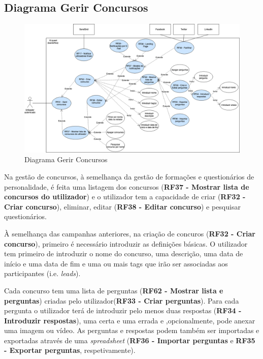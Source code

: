 \subsection{Diagrama Gerir Concursos}
\label{d:concursos}
\begin{figure}[ht!]
	\begin{center}
		\includegraphics[width=1\textwidth]{img/rf/gerir-concurso}
		\caption{Diagrama Gerir Concursos}
		\label{fig:rf-gerir-concursos}
	\end{center}
\end{figure}


Na gestão de concursos, à semelhança da gestão de formações e questionários de personalidade, é feita uma listagem dos concursos (\textbf{RF37 - Mostrar lista de concursos do utilizador}) e o utilizador tem a capacidade de criar (\textbf{RF32 - Criar concurso}), eliminar, editar (\textbf{RF38 - Editar concurso}) e pesquisar questionários.

À semelhança das campanhas anteriores, na criação de concuros (\textbf{RF32 - Criar concurso}), primeiro é necessário introduzir as definições básicas. O utilizador tem primeiro de introduzir o nome do concurso, uma descrição, uma data de início e uma data de fim e uma ou mais tags que irão ser associadas aos participantes (i.e. \textit{leads}).

Cada concurso tem uma lista de perguntas (\textbf{RF62 - Mostrar lista e perguntas}) criadas pelo utilizador(\textbf{RF33 - Criar perguntas}). Para cada pergunta o utilizador terá de introduzir pelo menos duas respostas (\textbf{RF34 - Introduzir respostas}), uma certa e uma errada e ,opcionalmente, pode anexar uma imagem ou vídeo. As perguntas e respostas podem também ser importadas e exportadas através de uma  \textit{spreadsheet} (\textbf{RF36 - Importar perguntas} e \textbf{RF35 - Exportar perguntas}, respetivamente).

